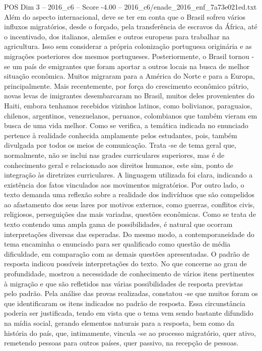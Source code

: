 \begin{textsample}{POS Dim 3 – 2016\_c6 – Score -4.00 – 2016\_c6/enade\_2016\_enf\_7a73e021ed.txt}
Além do aspecto internacional, deve se ter em conta que o Brasil sofreu vários influxos migratórios, desde o forçado, pela transferência de escravos da África, até o incentivado, dos italianos, alemães e outros europeus para trabalhar na agricultura.
Isso sem considerar a própria colonização portuguesa originária e as migrações posteriores dos mesmos portugueses.
Posteriormente, o Brasil tornou -se um país de emigrantes que foram aportar a outros locais na busca de melhor situação econômica.
Muitos migraram para a América do Norte e para a Europa, principalmente.
Mais recentemente, por força do crescimento econômico pátrio, novas levas de imigrantes desembarcaram no Brasil, muitos deles provenientes do Haiti, embora tenhamos recebidos vizinhos latinos, como bolivianos, paraguaios, chilenos, argentinos, venezuelanos, peruanos, colombianos que também vieram em busca de uma vida melhor.
Como se verifica, a temática indicada no enunciado pertence à realidade conhecida amplamente pelos estudantes, pois, também divulgada por todos os meios de comunicação.
Trata -se de tema geral que, normalmente, não se inclui nas grades curriculares superiores, mas é de conhecimento geral e relacionado aos direitos humanos, este sim, ponto de integração às diretrizes curriculares.
A linguagem utilizada foi clara, indicando a existência dos fatos vinculados aos movimentos migratórios.
Por outro lado, o texto demanda uma reflexão sobre a realidade dos indivíduos que são compelidos ao afastamento dos seus lares por motivos externos, como guerras, conflitos civis, religiosos, perseguições das mais variadas, questões econômicas.
Como se trata de texto contendo uma ampla gama de possibilidades, é natural que ocorram interpretações diversas das esperadas.
Do mesmo modo, a contemporaneidade do tema encaminha o enunciado para ser qualificado como questão de média dificuldade, em comparação com as demais questões apresentadas.
O padrão de resposta indicou possíveis interpretações do texto.
No que concerne ao grau de profundidade, mostrou a necessidade de conhecimento de vários itens pertinentes à migração e que são refletidos nas várias possibilidades de resposta previstas pelo padrão.
Pela análise das provas realizadas, constatou -se que muitos foram os que identificaram os itens indicados no padrão de resposta.
Essa circunstância poderia ser justificada, tendo em vista que o tema vem sendo bastante difundido na mídia social, gerando elementos naturais para a resposta, bem como da história do país, que, intimamente, vincula -se ao processo migratório, quer ativo, remetendo pessoas para outros países, quer passivo, na recepção de pessoas.

\end{textsample}
